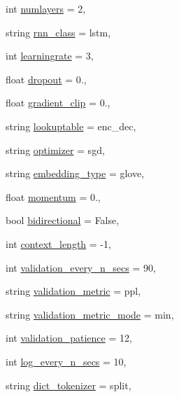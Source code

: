 \begin{DoxyCompactItemize}
int \hyperlink{namespaceseq2seq_1_1train_ad2a8f3a66d54e1de44ba1e4b0de47649}{numlayers} = 2,
\item 
string \hyperlink{namespaceseq2seq_1_1train_a1b062073c766f1d34a67f572ef256ba0}{rnn\+\_\+class} = \textquotesingle{}lstm\textquotesingle{},
\item 
int \hyperlink{namespaceseq2seq_1_1train_a664eec7778f242554bf6610f97966394}{learningrate} = 3,
\item 
float \hyperlink{namespaceseq2seq_1_1train_ad1c2b0c39f2fadec077284e46fd39c1f}{dropout} = 0.,
\item 
float \hyperlink{namespaceseq2seq_1_1train_a83e48008fc512270e9925dd68e036f5f}{gradient\+\_\+clip} = 0.,
\item 
string \hyperlink{namespaceseq2seq_1_1train_afbe5d45d2c949da3a8c66eac4543a9b3}{lookuptable} = \textquotesingle{}enc\+\_\+dec\textquotesingle{},
\item 
string \hyperlink{namespaceseq2seq_1_1train_aa6e00609e62d6fbec3d576663591b7bb}{optimizer} = \textquotesingle{}sgd\textquotesingle{},
\item 
string \hyperlink{namespaceseq2seq_1_1train_a9758fa4cd52b9250412b4f21c5405a69}{embedding\+\_\+type} = \textquotesingle{}glove\textquotesingle{},
\item 
float \hyperlink{namespaceseq2seq_1_1train_a3faade37a4499019f011811d0879b3e2}{momentum} = 0.,
\item 
bool \hyperlink{namespaceseq2seq_1_1train_acd1873392f6551da0aee33d73df6a570}{bidirectional} = False,
\item 
int \hyperlink{namespaceseq2seq_1_1train_a953274da20086938e3c7e5b3ef46b680}{context\+\_\+length} = -\/1,
\item 
int \hyperlink{namespaceseq2seq_1_1train_a266ef8a2f00a0546e7ee92c4c7f57dbf}{validation\+\_\+every\+\_\+n\+\_\+secs} = 90,
\item 
string \hyperlink{namespaceseq2seq_1_1train_ab7dc759732376d5c26c4fe19a20a98d3}{validation\+\_\+metric} = \textquotesingle{}ppl\textquotesingle{},
\item 
string \hyperlink{namespaceseq2seq_1_1train_a5969832e48e3c96d47f44696982cc0fa}{validation\+\_\+metric\+\_\+mode} = \textquotesingle{}min\textquotesingle{},
\item 
int \hyperlink{namespaceseq2seq_1_1train_a3ad0547cc33e5fbe164d33c47c452658}{validation\+\_\+patience} = 12,
\item 
int \hyperlink{namespaceseq2seq_1_1train_a4c977a1a64d14a75ab47d9d1a8db1c30}{log\+\_\+every\+\_\+n\+\_\+secs} = 10,
\item 
string \hyperlink{namespaceseq2seq_1_1train_a09ec735f9ac381654657c714f05a8875}{dict\+\_\+tokenizer} = \textquotesingle{}split\textquotesingle{},
\end{DoxyCompactItemize}


